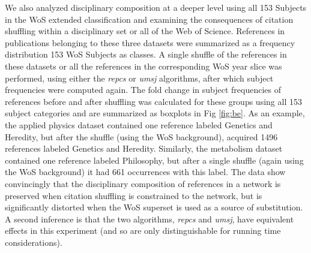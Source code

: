 \documentclass[NETN]{stjour}
\begin{document}
We also analyzed disciplinary composition at a deeper level using all 153 Subjects in the WoS extended classification and examining the consequences of  citation shuffling within a disciplinary set or all of the Web of Science.  References in publications belonging to these three datasets were summarized as a frequency distribution 153 WoS Subjects as classes. A single shuffle of the references in these datasets or all the references in the corresponding WoS year slice was performed, using either the \emph{repcs}  or \emph{umsj} algorithms, after which subject frequencies were computed again. The fold change in subject frequencies of references before and after shuffling was calculated for these groups using all 153 subject categories and are summarized as boxplots in Fig \ref{fig:be}. As an example, the applied physics dataset contained one reference labeled Genetics and Heredity, but after the shuffle (using the WoS background), acquired 1496 references labeled Genetics and Heredity. Similarly,  the metabolism dataset  contained one reference labeled Philosophy, but after a single shuffle (again using the WoS background) it had 661 occurrences with this label. The data show convincingly that the disciplinary composition of references in a network is preserved when citation shuffling is constrained to the network, but is significantly distorted when the WoS superset is used as a source of substitution. A second inference is that the two algorithms, \emph{repcs} and \emph{umsj}, have equivalent effects in this experiment (and so are only distinguishable for running time considerations).
\end{document}
